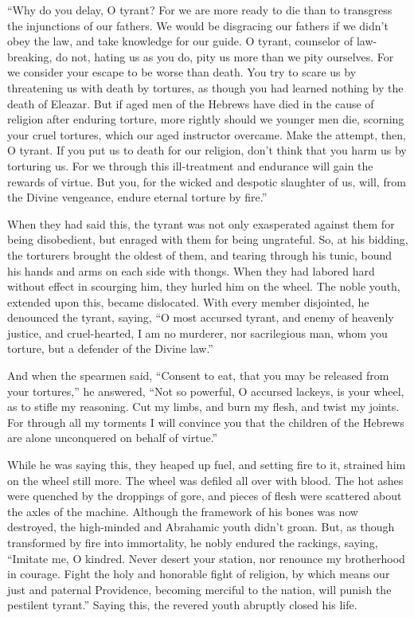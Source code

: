 ``Why do you delay, O tyrant? For we are more ready to die
than to transgress the injunctions of our fathers.  We would
be disgracing our fathers if we didn't obey the law, and take knowledge
for our guide.  O tyrant, counselor of law-breaking, do not,
hating us as you do, pity us more than we pity ourselves. 
For we consider your escape to be worse than death.  You try
to scare us by threatening us with death by tortures, as though you had
learned nothing by the death of Eleazar.  But if aged men of
the Hebrews have died in the cause of religion after enduring torture,
more rightly should we younger men die, scorning your cruel tortures,
which our aged instructor overcame.  Make the attempt, then,
O tyrant. If you put us to death for our religion, don't think that you
harm us by torturing us.  For we through this ill-treatment
and endurance will gain the rewards of virtue.  But you, for
the wicked and despotic slaughter of us, will, from the Divine
vengeance, endure eternal torture by fire.''

 When they had said this, the tyrant was not only
exasperated against them for being disobedient, but enraged with them
for being ungrateful.  So, at his bidding, the torturers
brought the oldest of them, and tearing through his tunic, bound his
hands and arms on each side with thongs.  When they had
labored hard without effect in scourging him, they hurled him on the
wheel.  The noble youth, extended upon this, became
dislocated.  With every member disjointed, he denounced the
tyrant, saying,  ``O most accursed tyrant, and enemy of
heavenly justice, and cruel-hearted, I am no murderer, nor sacrilegious
man, whom you torture, but a defender of the Divine law.''

 And when the spearmen said, ``Consent to eat, that you may
be released from your tortures,''  he answered, ``Not so
powerful, O accursed lackeys, is your wheel, as to stifle my reasoning.
Cut my limbs, and burn my flesh, and twist my joints.  For
through all my torments I will convince you that the children of the
Hebrews are alone unconquered on behalf of virtue.''

 While he was saying this, they heaped up fuel, and setting
fire to it, strained him on the wheel still more.  The
wheel was defiled all over with blood. The hot ashes were quenched by
the droppings of gore, and pieces of flesh were scattered about the
axles of the machine.  Although the framework of his bones
was now destroyed, the high-minded and Abrahamic youth didn't groan.
 But, as though transformed by fire into immortality, he
nobly endured the rackings, saying,  ``Imitate me, O
kindred. Never desert your station, nor renounce my brotherhood in
courage. Fight the holy and honorable fight of religion, 
by which means our just and paternal Providence, becoming merciful to
the nation, will punish the pestilent tyrant.''  Saying
this, the revered youth abruptly closed his life.

